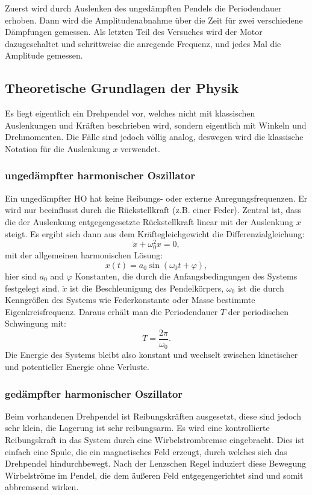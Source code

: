 Zuerst wird durch Auslenken des ungedämpften Pendels die Periodendauer erhoben. Dann wird die Amplitudenabnahme über die Zeit für zwei verschiedene Dämpfungen gemessen. Als letzten Teil des Versuches wird der Motor dazugeschaltet und schrittweise die anregende Frequenz, und jedes Mal die Amplitude gemessen. 

\subsection[Theoretische Grundlagen der Physik]{Theoretische Grundlagen der Physik\autocite{Skript_1}}
Es liegt eigentlich ein Drehpendel vor, welches nicht mit klassischen Auslenkungen und Kräften beschrieben wird, sondern eigentlich mit Winkeln und Drehmomenten. Die Fälle sind jedoch völlig analog, deswegen wird die klassische Notation für die Auslenkung \(x\) verwendet.

\subsubsection{ungedämpfter harmonischer Oszillator}
Ein ungedämpfter HO hat keine Reibungs- oder externe Anregungsfrequenzen. Er wird nur beeinflusst durch die Rückstellkraft (z.B. einer Feder). Zentral ist, dass die der Auslenkung entgegengesetzte Rückstellkraft linear mit der Auslenkung \(x\) steigt. Es ergibt sich dann aus dem Kräftegleichgewicht die Differenzialgleichung:
\begin{equation}
    \ddot{x} + \omega_0^2 x = 0,
\end{equation}
mit der allgemeinen harmonischen Lösung:
\begin{equation}
    x(t) = a_0 \sin(\omega_0 t + \varphi),
\end{equation}
hier sind \(a_0\) and \(\varphi\) Konstanten, die durch die Anfangsbedingungen des Systems festgelegt sind. \(\ddot{x}\) ist die Beschleunigung des Pendelkörpers, \(\omega_0\) ist die durch Kenngrößen des Systems wie Federkonstante oder Masse bestimmte Eigenkreisfrequenz. Daraus erhält man die Periodendauer \(T\) der periodischen Schwingung mit:
\begin{equation}
    T = \frac{2\pi}{\omega_0}.
    \label{eq:period_time}
\end{equation}
Die Energie des Systems bleibt also konstant und wechselt zwischen kinetischer und potentieller Energie ohne Verluste.

\subsubsection{gedämpfter harmonischer Oszillator}
Beim vorhandenen Drehpendel ist Reibungskräften ausgesetzt, diese sind jedoch sehr klein, die Lagerung ist sehr reibungsarm. Es wird eine kontrollierte Reibungskraft in das System durch eine Wirbelstrombremse eingebracht. Dies ist einfach eine Spule, die ein magnetisches Feld erzeugt, durch welches sich das Drehpendel hindurchbewegt. Nach der Lenzschen Regel induziert diese Bewegung Wirbelströme im Pendel, die dem äußeren Feld entgegengerichtet sind und somit abbremsend wirken. 

